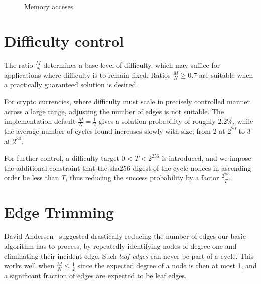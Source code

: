 \documentclass[11pt, oneside]{article}
\begin{document}
\begin{figure}
\begin{center}
\end{center}
\caption{Memory acceses}
\label{accesses}
\end{figure}

\section{Difficulty control}
The ratio $\frac{M}{N}$ determines a base level of difficulty,
which may suffice for applications where difficulty is to remain fixed.
Ratios $\frac{M}{N} \geq 0.7$ are suitable when a practically guaranteed solution is desired.

For crypto currencies, where difficulty must scale in precisely
controlled manner across a large range, adjusting the number of edges is not suitable.
The implementation default $\frac{M}{N}=\frac{1}{2}$ gives a solution probability of roughly $2.2\%$,
while the average number of cycles found increases slowly with size; from 2 at $2^{20}$
to 3 at $2^{30}$.

For further control, a difficulty target $0 < T < 2^{256}$ is introduced,
and we impose the additional constraint that the sha256 digest of the
cycle nonces in ascending order be less than $T$, thus
reducing the success probability by a factor $\frac{2^{256}}{T}$.

\section{Edge Trimming}
\label{edge_trimming}
David Andersen~\cite{dga2014} suggested drastically reducing the number of edges
our basic algorithm has to process, by repeatedly identifying nodes of degree one
and eliminating their incident edge. Such {\em leaf edges} can never be part of a cycle.
This works well when $\frac{M}{N} \leq \frac{1}{2}$ since the expected degree of a node is then at most 1,
and a significant fraction of edges are expected to be leaf edges.
\end{document}
